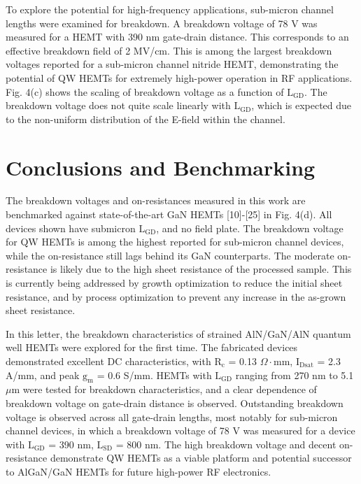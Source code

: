 \documentclass[journal]{IEEEtran}
\begin{document}
To explore the potential for high-frequency applications, sub-micron channel lengths were examined for breakdown. A breakdown voltage of 78 V was measured for a HEMT with 390 nm gate-drain distance. This corresponds to an effective breakdown field of 2 MV/cm. This is among the largest breakdown voltages reported for a sub-micron channel nitride HEMT, demonstrating the potential of QW HEMTs for extremely high-power operation in RF applications. Fig. 4(c) shows the scaling of breakdown voltage as a function of $\mathrm{L_{GD}}$. The breakdown voltage does not quite scale linearly with $\mathrm{L_{GD}}$, which is expected due to the non-uniform distribution of the E-field within the channel.

\section{Conclusions and Benchmarking}
The breakdown voltages and on-resistances measured in this work are benchmarked against state-of-the-art GaN HEMTs [10]-[25] in Fig. 4(d). All devices shown have submicron $\mathrm{L_{GD}}$, and no field plate. The breakdown voltage for QW HEMTs is among the highest reported for sub-micron channel devices, while the on-resistance still lags behind its GaN counterparts. The moderate on-resistance is likely due to the high sheet resistance of the processed sample. This is currently being addressed by growth optimization to reduce the initial sheet resistance, and by process optimization to prevent any increase in the as-grown sheet resistance.

In this letter, the breakdown characteristics of strained AlN/GaN/AlN quantum well HEMTs were explored for the first time. The fabricated devices demonstrated excellent DC characteristics, with $\mathrm{R_c}$ = 0.13 $\Omega\cdot$mm, $\mathrm{I_{Dsat}}$ = 2.3 A/mm, and peak $\mathrm{g_m}$ = 0.6 S/mm. HEMTs with $\mathrm{L_{GD}}$ ranging from 270 nm to 5.1 $\mu$m were tested for breakdown characteristics, and a clear dependence of breakdown voltage on gate-drain distance is observed. Outstanding breakdown voltage is observed across all gate-drain lengths, most notably for sub-micron channel devices, in which a breakdown voltage of 78 V was measured for a device with $\mathrm{L_{GD}}$ = 390 nm, $\mathrm{L_{SD}}$ = 800 nm. The high breakdown voltage and decent on-resistance demonstrate QW HEMTs as a viable platform and potential successor to AlGaN/GaN HEMTs for future high-power RF electronics.

\vfill
\end{document}
